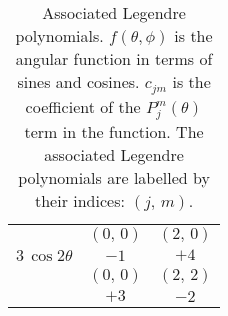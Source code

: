 \begin{table}[p]
\begin{tabular}{| c | c | c |}
       &  $(0,\,0)$  &  $(2,\,0)$        \\
    \cline{2-3}
    $3\,\cos2\theta$  &  $-1$  &  $+4$   \\
    \cline{2-3}
       &  $(0,\,0)$  &  $(2,\,2)$        \\
    \cline{2-3}
       &  $+3$  &  $-2$                  \\
    \hline
  \end{tabular}

  \caption{Associated Legendre polynomials. $f(\theta, \phi)$ is the angular function in terms of
    sines and cosines. $c_{jm}$ is the coefficient of the $P_j^m(\theta)$ term in the function. The
    associated Legendre polynomials are labelled by their indices: $(j,\,m)$.}
  \label{tab:assLegendre}
\end{table}

